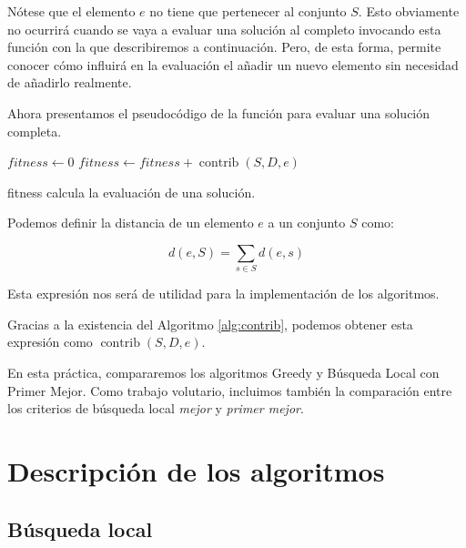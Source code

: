 \documentclass{article}
\begin{document}
Nótese que el elemento $e$ no tiene que pertenecer al conjunto $S$. Esto obviamente no ocurrirá cuando se vaya a evaluar una solución
al completo invocando esta función con la que describiremos a continuación. Pero, de esta forma, permite conocer cómo influirá en la evaluación el añadir
 un nuevo elemento sin necesidad de añadirlo realmente. 
 
 Ahora presentamos el pseudocódigo de la función para evaluar una solución completa.
 \begin{algorithm}
 	\DontPrintSemicolon %
 	$fitness \gets 0$\;
 	 {
 		$fitness \gets fitness + \operatorname{contrib}(S,D,e)$ 
 	}
 	  
 	\caption{{\sc fitness} calcula la evaluación de una solución.}
 	\label{alg:eval}
 \end{algorithm}

Podemos definir la distancia de un elemento $e$ a un conjunto $S$ como:

\begin{equation} \label{eq:distance-elem-set}
	d(e,S)=\sum_{s\in S} d(e,s)
\end{equation}

Esta expresión nos será de utilidad para la implementación de los algoritmos.

Gracias a la existencia del Algoritmo \ref{alg:contrib}, podemos obtener esta expresión como $\operatorname{contrib}(S,D,e)$.

En esta práctica, compararemos los algoritmos Greedy y Búsqueda Local con Primer Mejor. Como trabajo volutario, incluimos también
 la comparación
entre los criterios de búsqueda local \emph{mejor} y \emph{primer mejor}.

\pagebreak

\section{Descripción de los algoritmos}

\subsection{Búsqueda local}
\end{document}
